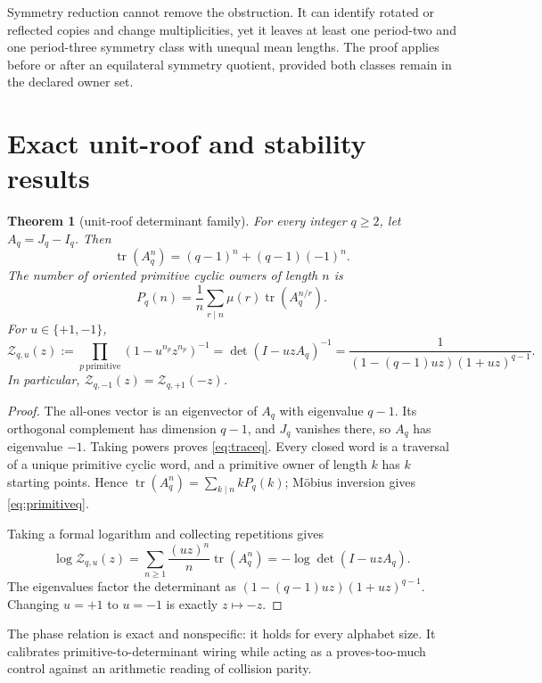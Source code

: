 \documentclass[11pt,a4paper]{article}
\newtheorem{theorem}{Theorem}[section]
\theoremstyle{definition}
\theoremstyle{remark}
\newcommand{\tr}{\operatorname{tr}}
\newcommand{\Zeta}{\mathcal Z}
\begin{document}
Symmetry reduction cannot remove the obstruction. It can identify rotated or reflected copies and change multiplicities, yet it leaves at least one period-two and one period-three symmetry class with unequal mean lengths. The proof applies before or after an equilateral symmetry quotient, provided both classes remain in the declared owner set.

\section{Exact unit-roof and stability results}

\begin{theorem}[unit-roof determinant family]\label{thm:qfamily}
For every integer \(q\ge2\), let \(A_q=J_q-I_q\). Then
\begin{equation}\label{eq:traceq}
 \tr(A_q^n)=(q-1)^n+(q-1)(-1)^n.
\end{equation}
The number of oriented primitive cyclic owners of length \(n\) is
\begin{equation}\label{eq:primitiveq}
 P_q(n)=\frac1n\sum_{r\mid n}\mu(r)\tr(A_q^{n/r}).
\end{equation}
For \(u\in\{+1,-1\}\),
\begin{equation}\label{eq:zetaq}
 \Zeta_{q,u}(z)
 :=\prod_{p\ \mathrm{primitive}}\left(1-u^{n_p}z^{n_p}\right)^{-1}
 =\det(I-uzA_q)^{-1}
 =\frac{1}{(1-(q-1)uz)(1+uz)^{q-1}}.
\end{equation}
In particular, \(\Zeta_{q,-1}(z)=\Zeta_{q,+1}(-z)\).
\end{theorem}

\begin{proof}
The all-ones vector is an eigenvector of \(A_q\) with eigenvalue \(q-1\). Its orthogonal complement has dimension \(q-1\), and \(J_q\) vanishes there, so \(A_q\) has eigenvalue \(-1\). Taking powers proves \cref{eq:traceq}. Every closed word is a traversal of a unique primitive cyclic word, and a primitive owner of length \(k\) has \(k\) starting points. Hence
\(\tr(A_q^n)=\sum_{k\mid n}kP_q(k)\); Möbius inversion gives \cref{eq:primitiveq}.

Taking a formal logarithm and collecting repetitions gives
\[
 \log\Zeta_{q,u}(z)
 =\sum_{n\ge1}\frac{(uz)^n}{n}\tr(A_q^n)
 =-\log\det(I-uzA_q).
\]
The eigenvalues factor the determinant as
\((1-(q-1)uz)(1+uz)^{q-1}\). Changing \(u=+1\) to \(u=-1\) is exactly \(z\mapsto-z\).
\end{proof}

The phase relation is exact and nonspecific: it holds for every alphabet size. It calibrates primitive-to-determinant wiring while acting as a proves-too-much control against an arithmetic reading of collision parity.
\end{document}
